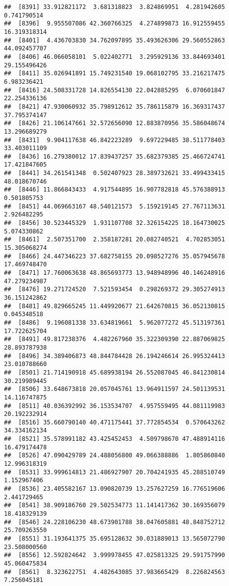 \documentclass[
]{article}
\begin{document}
\begin{verbatim}
##  [8391] 33.912821172  3.681318823  3.824869951  4.281942605  0.741790514
##  [8396]  9.955507086 42.360766325  4.274899873 16.912559455 16.319318314
##  [8401]  4.436703830 34.762097895 35.493626306 29.560552863 44.092457707
##  [8406] 46.066058101  5.022402771  3.295929136 33.844693401 29.155496426
##  [8411] 35.026941891 15.749231540 19.068102795 33.216217475  6.983236421
##  [8416] 24.508331728 14.826554130 22.042885295  6.070601847 22.254336136
##  [8421] 47.930060932 35.798912612 35.786115879 16.369317437 37.795374147
##  [8426] 21.106147661 32.572656090 12.883870956 35.586048674 13.296689279
##  [8431]  9.904117638 46.842223289  9.697229485 38.511778403 33.403011109
##  [8436] 16.279380012 17.839437257 35.682379385 25.466724741 17.421847605
##  [8441] 34.261541348  0.502407923 28.389732621 33.499433415 48.018670746
##  [8446] 11.866843433  4.917544895 16.907782818 45.576388913  0.501805753
##  [8451] 44.069663167 48.540121573  5.159219145 27.767113631  2.926482295
##  [8456] 30.523445329  1.931107708 32.326154225 18.164730025  5.074330862
##  [8461]  2.507351700  2.358187281 20.082740521  4.702853051 15.305068274
##  [8466] 24.447346223 37.682758155 20.098527276 35.057945678 17.469748470
##  [8471] 17.760063638 48.865693773 13.948948996 40.146248916 47.279234987
##  [8476] 19.271724520  7.521593454  0.298269372 29.305274913 36.151242862
##  [8481] 49.829665245 11.449920677 21.642670815 36.052130815  0.045348518
##  [8486]  9.196081338 33.634819661  5.962077272 45.513197361 17.722625704
##  [8491] 49.817238376  4.482267960 35.322309390 22.887069825 28.893787938
##  [8496] 34.389406873 48.844784428 26.194246614 26.995324413 23.010788660
##  [8501] 21.714190918 45.689938194 26.552087045 46.841230814 30.219989445
##  [8506] 33.648673818 20.057045761 13.964911597 24.501139531 14.116747875
##  [8511] 40.036392992 36.153534707  4.957559495 44.081119983 20.192232914
##  [8516] 35.660790140 40.471175441 37.772854534  0.570643262 34.334162134
##  [8521] 35.578991182 43.425452453  4.509798670 47.488914116 16.479174478
##  [8526] 47.090429789 24.488056800 49.066388886  1.805860840 12.996318319
##  [8531] 33.999614813 21.486927907 20.704241935 45.288510749  1.152967406
##  [8536] 23.405582167 13.090820739 13.257627259 16.776519606  2.441729465
##  [8541] 38.909186760 29.502534773 11.141417362 30.169356079 18.418329139
##  [8546] 24.228106230 48.673901788 38.047605881 48.848752712 25.709263550
##  [8551] 31.193641375 35.695128632 30.031889013 13.565072790 23.508000560
##  [8556] 12.592824642  3.999978455 47.025813325 29.591757990 45.060475834
##  [8561]  8.323622751  4.482643085 37.983665429  8.226824563  7.256045181

\end{verbatim}
\end{document}
